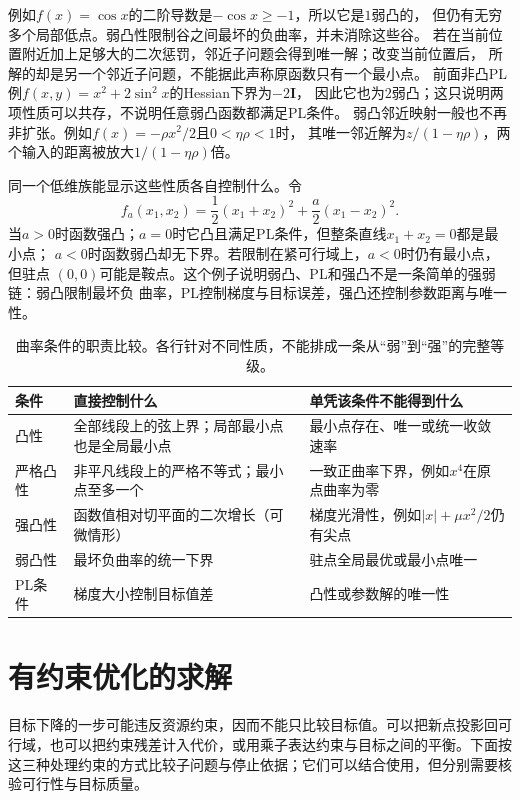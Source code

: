 例如$f(x)=\cos x$的二阶导数是$-\cos x\geq-1$，所以它是$1$弱凸的，
但仍有无穷多个局部低点。弱凸性限制谷之间最坏的负曲率，并未消除这些谷。
若在当前位置附近加上足够大的二次惩罚，邻近子问题会得到唯一解；改变当前位置后，
所解的却是另一个邻近子问题，不能据此声称原函数只有一个最小点。
前面非凸PL例$f(x,y)=x^2+2\sin^2x$的Hessian下界为$-2\bm I$，
因此它也为$2$弱凸；这只说明两项性质可以共存，不说明任意弱凸函数都满足PL条件。
弱凸邻近映射一般也不再非扩张。例如$f(x)=-\rho x^2/2$且$0<\eta\rho<1$时，
其唯一邻近解为$z/(1-\eta\rho)$，两个输入的距离被放大$1/(1-\eta\rho)$倍。

同一个低维族能显示这些性质各自控制什么。令
\[
  f_a(x_1,x_2)=\frac12(x_1+x_2)^2+\frac{a}{2}(x_1-x_2)^2.
\]
当$a>0$时函数强凸；$a=0$时它凸且满足PL条件，但整条直线$x_1+x_2=0$都是最小点；
$a<0$时函数弱凸却无下界。若限制在紧可行域上，$a<0$时仍有最小点，但驻点
$(0,0)$可能是鞍点。这个例子说明弱凸、PL和强凸不是一条简单的强弱链：弱凸限制最坏负
曲率，PL控制梯度与目标误差，强凸还控制参数距离与唯一性。

\begin{table}[htbp]
 \centering\small
 \begin{tabularx}{\linewidth}{@{}lXX@{}}
 \toprule
 条件 & 直接控制什么 & 单凭该条件不能得到什么\\
 \midrule
 凸性 & 全部线段上的弦上界；局部最小点也是全局最小点 & 最小点存在、唯一或统一收敛速率\\
 严格凸性 & 非平凡线段上的严格不等式；最小点至多一个 & 一致正曲率下界，例如$x^4$在原点曲率为零\\
 强凸性 & 函数值相对切平面的二次增长（可微情形） & 梯度光滑性，例如$|x|+\mu x^2/2$仍有尖点\\
 弱凸性 & 最坏负曲率的统一下界 & 驻点全局最优或最小点唯一\\
 PL条件 & 梯度大小控制目标值差 & 凸性或参数解的唯一性\\
 \bottomrule
 \end{tabularx}
 \caption{曲率条件的职责比较。各行针对不同性质，不能排成一条从“弱”到“强”的完整等级。}
 \label{tab:opt-curvature-conditions}
\end{table}

\section{有约束优化的求解}
\label{sec:opt-constraints-duality-certificates}

目标下降的一步可能违反资源约束，因而不能只比较目标值。可以把新点投影回可行域，也可以把约束残差计入代价，或用乘子表达约束与目标之间的平衡。下面按这三种处理约束的方式比较子问题与停止依据；它们可以结合使用，但分别需要核验可行性与目标质量。

